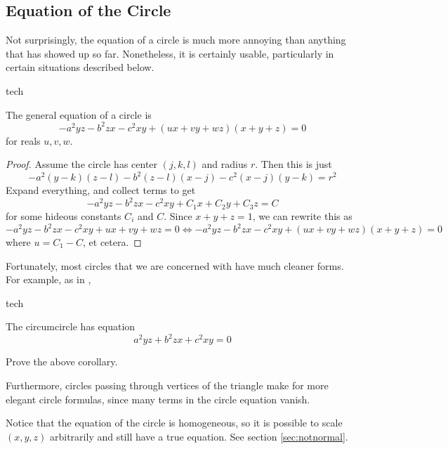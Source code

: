 \subsection{Equation of the Circle}
Not surprisingly, the equation of a circle \cite{infinity} is much more annoying than anything that has showed up so far.  Nonetheless, it is certainly usable, particularly in certain situations described below.

\begin{StoreCode}{tech}
\begin{theorem}
  \label{tech:circle}
  The general equation of a circle is \[ -a^2yz - b^2zx -c^2xy + (ux+vy+wz)(x+y+z) = 0 \] for reals $u,v,w$.
\end{theorem}
\end{StoreCode}
\begin{proof}
  Assume the circle has center $(j,k,l)$ and radius $r$.  Then this is just
  \[ -a^2(y-k)(z-l) - b^2(z-l)(x-j) - c^2(x-j)(y-k) = r^2 \]
  Expand everything, and collect terms to get
  \[ -a^2yz - b^2zx - c^2xy + C_1 x + C_2 y + C_3 z = C \]
  for some hideous constants $C_i$ and $C$.  Since $x+y+z = 1$, we can rewrite this as
  \[ -a^2yz - b^2zx - c^2xy + ux + vy + wz = 0 \iff -a^2yz - b^2zx -c^2xy + (ux+vy+wz)(x+y+z) = 0\]
  where $u=C_1-C$, et cetera.
\end{proof}

Fortunately, most circles that we are concerned with have much cleaner forms.  For example, as in \cite{infinity},
\begin{StoreCode}{tech}
\begin{corollary}
  The circumcircle has equation \[ a^2yz + b^2zx + c^2xy = 0 \]
\end{corollary}
\end{StoreCode}
\begin{exercise}
  Prove the above corollary.
\end{exercise}

Furthermore, circles passing through vertices of the triangle make for more elegant circle formulas, since many terms in the circle equation vanish.

\begin{note}
  Notice that the equation of the circle is homogeneous, so it is possible to scale $(x,y,z)$ arbitrarily and still have a true equation.  See section \ref{sec:notnormal}.
\end{note}
